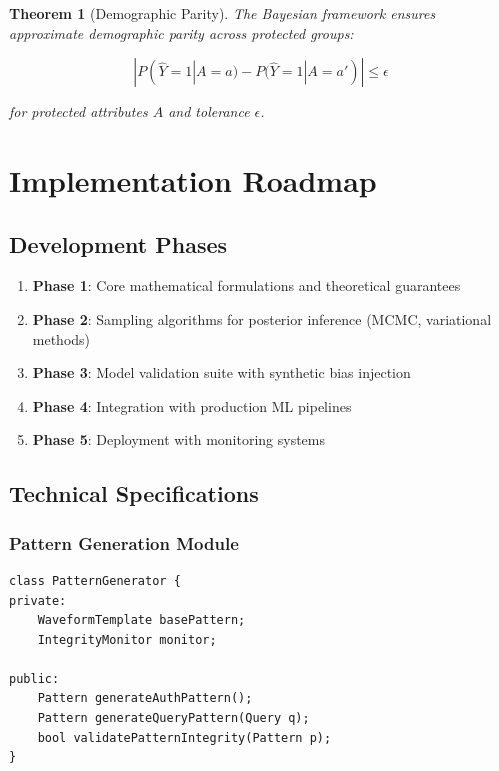 \documentclass[11pt,a4paper]{article}
\theoremstyle{plain}
\newtheorem{theorem}{Theorem}[section]
\theoremstyle{definition}
\theoremstyle{remark}
\begin{document}
\begin{theorem}[Demographic Parity]
The Bayesian framework ensures approximate demographic parity across protected groups:

\begin{equation}
|P(\hat{Y} = 1 | A = a) - P(\hat{Y} = 1 | A = a')| \leq \epsilon
\end{equation}

for protected attributes $A$ and tolerance $\epsilon$.
\end{theorem}

\section{Implementation Roadmap}

\subsection{Development Phases}

\begin{enumerate}
    \item \textbf{Phase 1}: Core mathematical formulations and theoretical guarantees
    \item \textbf{Phase 2}: Sampling algorithms for posterior inference (MCMC, variational methods)
    \item \textbf{Phase 3}: Model validation suite with synthetic bias injection
    \item \textbf{Phase 4}: Integration with production ML pipelines
    \item \textbf{Phase 5}: Deployment with monitoring systems
\end{enumerate}

\subsection{Technical Specifications}

\subsubsection{Pattern Generation Module}
\begin{verbatim}
class PatternGenerator {
private:
    WaveformTemplate basePattern;
    IntegrityMonitor monitor;
    
public:
    Pattern generateAuthPattern();
    Pattern generateQueryPattern(Query q);
    bool validatePatternIntegrity(Pattern p);
}
\end{verbatim}
\end{document}
